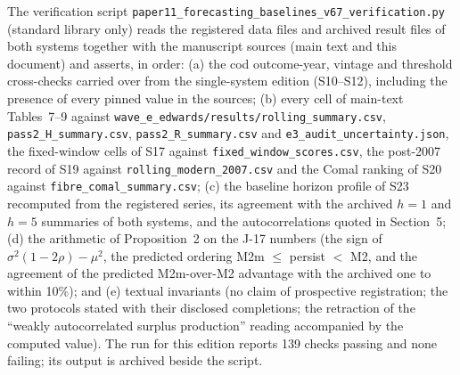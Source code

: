 The verification script \texttt{paper11\_forecasting\_\allowbreak{}baselines\_v67\_\allowbreak{}verification.py} (standard library only) reads the registered data files and archived result files of both systems together with the manuscript sources (main text and this document) and asserts, in order: (a) the cod outcome-year, vintage and threshold cross-checks carried over from the single-system edition (S10--S12), including the presence of every pinned value in the sources; (b) every cell of main-text Tables~7--9 against \texttt{wave\_e\_edwards/results/rolling\_summary.csv}, \texttt{pass2\_H\_summary.csv}, \texttt{pass2\_R\_summary.csv} and \texttt{e3\_audit\_uncertainty.json}, the fixed-window cells of S17 against \texttt{fixed\_window\_scores.csv}, the post-2007 record of S19 against \texttt{rolling\_modern\_2007.csv} and the Comal ranking of S20 against \texttt{fibre\_comal\_summary.csv}; (c) the baseline horizon profile of S23 recomputed from the registered series, its agreement with the archived $h=1$ and $h=5$ summaries of both systems, and the autocorrelations quoted in Section~5; (d) the arithmetic of Proposition~2 on the J-17 numbers (the sign of $\sigma^2(1-2\rho)-\mu^2$, the predicted ordering M2m $\le$ persist $<$ M2, and the agreement of the predicted M2m-over-M2 advantage with the archived one to within 10\%); and (e) textual invariants (no claim of prospective registration; the two protocols stated with their disclosed completions; the retraction of the ``weakly autocorrelated surplus production'' reading accompanied by the computed value). The run for this edition reports 139 checks passing and none failing; its output is archived beside the script.


